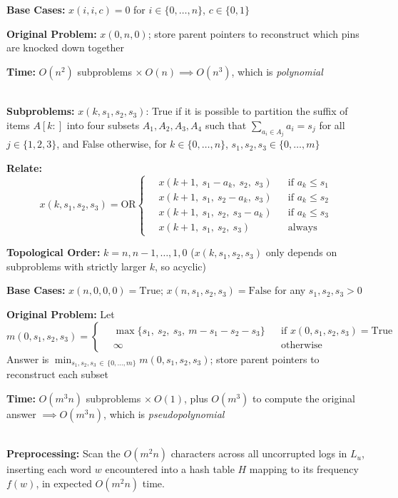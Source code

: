 \documentclass[12pt,twoside]{article}
\begin{document}
\begin{problems}
\textbf{Base Cases:} $x(i,i,c) = 0$ for $i \in \{0,\dots,n\}$, $c \in \{0,1\}$

\textbf{Original Problem:} $x(0,n,0)$; store parent pointers to reconstruct which pins are knocked down together

\textbf{Time:} $O(n^2)$ subproblems $\times\ O(n) \implies O(n^3)$, which is \emph{polynomial}


\problem  %
\\
\textbf{Subproblems:} $x(k,s_1,s_2,s_3)$: True if it is possible to partition the suffix of items $A[k:]$ into four subsets $A_1, A_2, A_3, A_4$ such that $\sum_{a_i \in A_j} a_i = s_j$ for all $j \in \{1,2,3\}$, and False otherwise, for $k \in \{0,\dots,n\}$, $s_1, s_2, s_3 \in \{0,\dots,m\}$

\textbf{Relate:}
\[
x(k,s_1,s_2,s_3) = \mathrm{OR}\left\{\,
\begin{aligned}
&x(k+1,\ s_1 - a_k,\ s_2,\ s_3) &&\text{if } a_k \leq s_1 \\
&x(k+1,\ s_1,\ s_2 - a_k,\ s_3) &&\text{if } a_k \leq s_2 \\
&x(k+1,\ s_1,\ s_2,\ s_3 - a_k) &&\text{if } a_k \leq s_3 \\
&x(k+1,\ s_1,\ s_2,\ s_3) &&\text{always}
\end{aligned}
\right.
\]

\textbf{Topological Order:} $k = n, n-1, \dots, 1, 0$ ($x(k,s_1,s_2,s_3)$ only depends on subproblems with strictly larger $k$, so acyclic)

\textbf{Base Cases:} $x(n,0,0,0) = \text{True}$; $x(n,s_1,s_2,s_3) = \text{False}$ for any $s_1, s_2, s_3 > 0$

\textbf{Original Problem:}
Let
\[
m(0,s_1,s_2,s_3) = \left\{\,
\begin{aligned}
&\max\{s_1,\ s_2,\ s_3,\ m - s_1 - s_2 - s_3\} &&\text{if } x(0,s_1,s_2,s_3) = \text{True} \\
&\infty &&\text{otherwise}
\end{aligned}
\right.
\]
Answer is $\displaystyle\min_{s_1,s_2,s_3 \,\in\, \{0,\dots,m\}} m(0,s_1,s_2,s_3)$; store parent pointers to reconstruct each subset

\textbf{Time:} $O(m^3 n)$ subproblems $\times\ O(1)$, plus $O(m^3)$ to compute the original answer $\implies O(m^3 n)$, which is \emph{pseudopolynomial}

\newpage

\problem  %
\\
\textbf{Preprocessing:} Scan the $O(m^2 n)$ characters across all uncorrupted logs in $L_u$, inserting each word $w$ encountered into a hash table $H$ mapping to its frequency $f(w)$, in expected $O(m^2 n)$ time.


\end{problems}
\end{document}
